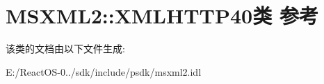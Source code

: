 \hypertarget{class_m_s_x_m_l2_1_1_x_m_l_h_t_t_p40}{}\section{M\+S\+X\+M\+L2\+:\+:X\+M\+L\+H\+T\+T\+P40类 参考}
\label{class_m_s_x_m_l2_1_1_x_m_l_h_t_t_p40}


该类的文档由以下文件生成\+:\begin{DoxyCompactItemize}
\item 
E\+:/\+React\+O\+S-\/0../sdk/include/psdk/msxml2.\+idl\end{DoxyCompactItemize}
